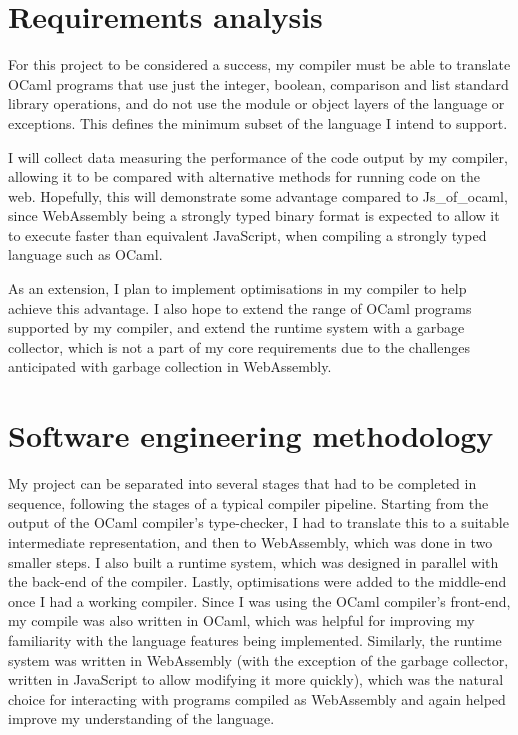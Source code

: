 \section{Requirements analysis}
For this project to be considered a success, my compiler must be able to translate OCaml programs that use just the integer, boolean, comparison and list standard library operations, and do not use the module or object layers of the language or exceptions. This defines the minimum subset of the language I intend to support. 

I will collect data measuring the performance of the code output by my compiler, allowing it to be compared with alternative methods for running code on the web.  Hopefully, this will demonstrate some advantage compared to Js\_of\_ocaml, since WebAssembly being a strongly typed binary format is expected to allow it to execute faster than equivalent JavaScript, when compiling a strongly typed language such as OCaml.

As an extension, I plan to implement optimisations in my compiler to help achieve this advantage. I also hope to extend the range of OCaml programs supported by my compiler, and extend the runtime system with a garbage collector, which is not a part of my core requirements due to the challenges anticipated with garbage collection in WebAssembly.



\section{Software engineering methodology}

My project can be separated into several stages that had to be completed in sequence, following the stages of a typical compiler pipeline. Starting from the output of the OCaml compiler's type-checker, I had to translate this to a suitable intermediate representation, and then to WebAssembly, which was done in two smaller steps. I also built a runtime system, which was designed in parallel with the back-end of the compiler. Lastly, optimisations were added to the middle-end once I had a working compiler. Since I was using the OCaml compiler's front-end, my compile was also written in OCaml, which was helpful for improving my familiarity with the language features being implemented. Similarly, the runtime system was written in WebAssembly (with the exception of the garbage collector, written in JavaScript to allow modifying it more quickly), which was the natural choice for interacting with programs compiled as WebAssembly and again helped improve my understanding of the language.

